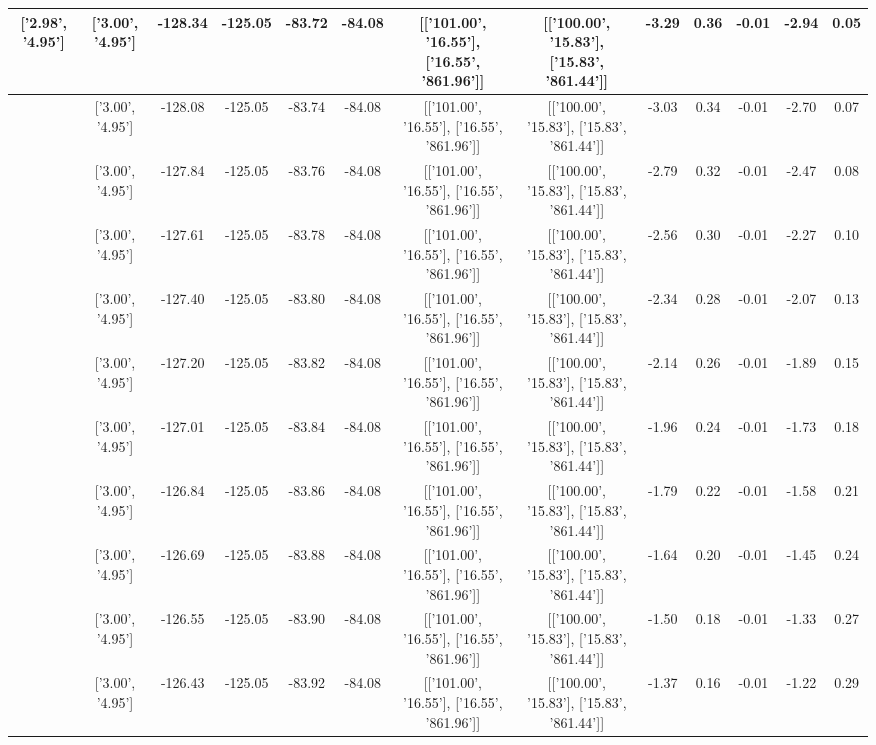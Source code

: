 \begin{table}[htbp]
\begin{adjustbox}{angle=90}
\begin{tabular}{|c|c|c|c|c|c|c|c|c|c|c|c|c|}
 ['2.98', '4.95'] & ['3.00', '4.95'] & -128.34 & -125.05 & -83.72 & -84.08 & [['101.00', '16.55'], ['16.55', '861.96']] & [['100.00', '15.83'], ['15.83', '861.44']] & -3.29 & 0.36 & -0.01 & -2.94 & 0.05\\ \hline
 ['2.98', '4.95'] & ['3.00', '4.95'] & -128.08 & -125.05 & -83.74 & -84.08 & [['101.00', '16.55'], ['16.55', '861.96']] & [['100.00', '15.83'], ['15.83', '861.44']] & -3.03 & 0.34 & -0.01 & -2.70 & 0.07\\ \hline
 ['2.98', '4.95'] & ['3.00', '4.95'] & -127.84 & -125.05 & -83.76 & -84.08 & [['101.00', '16.55'], ['16.55', '861.96']] & [['100.00', '15.83'], ['15.83', '861.44']] & -2.79 & 0.32 & -0.01 & -2.47 & 0.08\\ \hline
 ['2.98', '4.95'] & ['3.00', '4.95'] & -127.61 & -125.05 & -83.78 & -84.08 & [['101.00', '16.55'], ['16.55', '861.96']] & [['100.00', '15.83'], ['15.83', '861.44']] & -2.56 & 0.30 & -0.01 & -2.27 & 0.10\\ \hline
 ['2.98', '4.95'] & ['3.00', '4.95'] & -127.40 & -125.05 & -83.80 & -84.08 & [['101.00', '16.55'], ['16.55', '861.96']] & [['100.00', '15.83'], ['15.83', '861.44']] & -2.34 & 0.28 & -0.01 & -2.07 & 0.13\\ \hline
 ['2.98', '4.95'] & ['3.00', '4.95'] & -127.20 & -125.05 & -83.82 & -84.08 & [['101.00', '16.55'], ['16.55', '861.96']] & [['100.00', '15.83'], ['15.83', '861.44']] & -2.14 & 0.26 & -0.01 & -1.89 & 0.15\\ \hline
 ['2.99', '4.95'] & ['3.00', '4.95'] & -127.01 & -125.05 & -83.84 & -84.08 & [['101.00', '16.55'], ['16.55', '861.96']] & [['100.00', '15.83'], ['15.83', '861.44']] & -1.96 & 0.24 & -0.01 & -1.73 & 0.18\\ \hline
 ['2.99', '4.95'] & ['3.00', '4.95'] & -126.84 & -125.05 & -83.86 & -84.08 & [['101.00', '16.55'], ['16.55', '861.96']] & [['100.00', '15.83'], ['15.83', '861.44']] & -1.79 & 0.22 & -0.01 & -1.58 & 0.21\\ \hline
 ['2.99', '4.95'] & ['3.00', '4.95'] & -126.69 & -125.05 & -83.88 & -84.08 & [['101.00', '16.55'], ['16.55', '861.96']] & [['100.00', '15.83'], ['15.83', '861.44']] & -1.64 & 0.20 & -0.01 & -1.45 & 0.24\\ \hline
 ['2.99', '4.95'] & ['3.00', '4.95'] & -126.55 & -125.05 & -83.90 & -84.08 & [['101.00', '16.55'], ['16.55', '861.96']] & [['100.00', '15.83'], ['15.83', '861.44']] & -1.50 & 0.18 & -0.01 & -1.33 & 0.27\\ \hline
 ['2.99', '4.95'] & ['3.00', '4.95'] & -126.43 & -125.05 & -83.92 & -84.08 & [['101.00', '16.55'], ['16.55', '861.96']] & [['100.00', '15.83'], ['15.83', '861.44']] & -1.37 & 0.16 & -0.01 & -1.22 & 0.29\\ \hline

\end{tabular}
\end{adjustbox}
\end{table}
